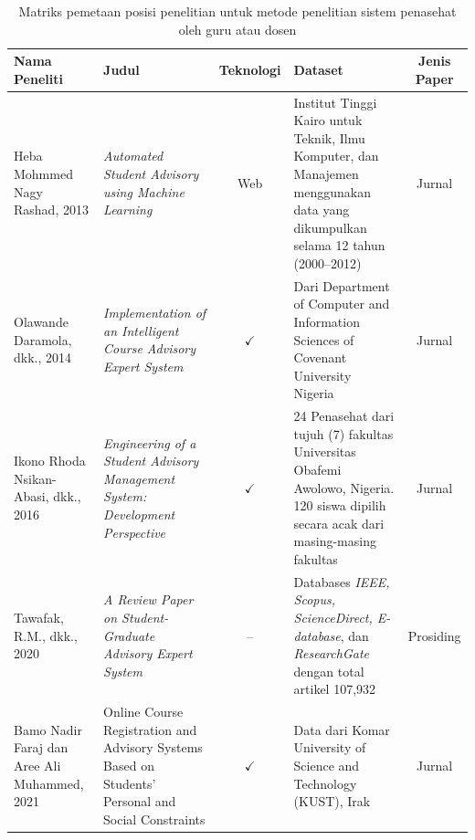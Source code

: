\begin{landscape}
	\begin{table}
		\centering
		\renewcommand{\arraystretch}{1.2}
		\setlength\extrarowheight{2pt}
		\caption{Matriks pemetaan posisi penelitian untuk metode penelitian sistem penasehat oleh guru atau dosen}
		\label{tab:2}
		\begin{tabularx}{\linewidth}{|Y|Y|c|Y|c|}
			\hline
			\textbf{Nama Peneliti} & \textbf{Judul} & \textbf{Teknologi} & \textbf{Dataset} & \textbf{Jenis Paper} \\
			\hline
			Heba Mohmmed Nagy Rashad, 2013 & \textit{Automated Student Advisory using Machine Learning} & Web & Institut Tinggi Kairo untuk Teknik, Ilmu Komputer, dan Manajemen menggunakan data yang dikumpulkan selama 12 tahun (2000–2012) & Jurnal \\
			\hline
			Olawande Daramola, dkk., 2014 & \textit{Implementation of an Intelligent Course Advisory Expert System} & $\checkmark$ & Dari Department of Computer and Information Sciences of Covenant University Nigeria & Jurnal \\
			\hline
			Ikono Rhoda Nsikan-Abasi, dkk., 2016 & \textit{Engineering of a Student Advisory Management System: Development Perspective} & $\checkmark$ & 24 Penasehat dari tujuh (7) fakultas Universitas Obafemi Awolowo, Nigeria. 120 siswa dipilih secara acak dari masing-masing fakultas & Jurnal \\
			\hline
			Tawafak, R.M., dkk., 2020 & \textit{A Review Paper on Student-Graduate Advisory Expert System} & – & Databases \textit{IEEE, Scopus, ScienceDirect, E-database}, dan \textit{ResearchGate} dengan total artikel 107,932 & Prosiding \\
			\hline
			Bamo Nadir Faraj dan Aree Ali Muhammed, 2021 & Online Course Registration and Advisory Systems Based on Students’ Personal and Social Constraints & $\checkmark$ & Data dari Komar University of Science and Technology (KUST), Irak & Jurnal \\
			\hline
		\end{tabularx}
	\end{table}
\end{landscape}
